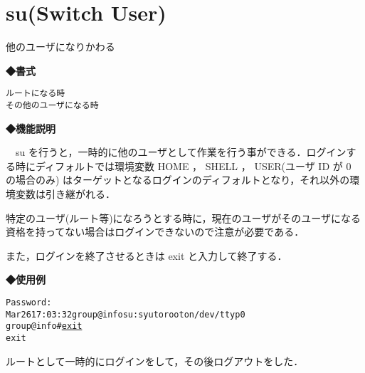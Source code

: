 \label{cmd:su}
\section{su(Switch User)}

他のユーザになりかわる\par

{\bf ◆書式}
\begin{center}
\begin{screen}
\begin{alltt}
 ルートになる時
 % su
 その他のユーザになる時
 % su ユーザ名
\end{alltt}
\end{screen}
\end{center}

{\bf ◆機能説明}

　su を行うと，一時的に他のユーザとして作業を行う事ができる．ログインする時にディフォルトでは環境変数 HOME ， SHELL ， USER(ユーザ ID が 0 の場合のみ) はターゲットとなるログインのディフォルトとなり，それ以外の環境変数は引き継がれる．\par
 特定のユーザ(ルート等)になろうとする時に，現在のユーザがそのユーザになる資格を持ってない場合はログインできないので注意が必要である．\par
 また，ログインを終了させるときは exit と入力して終了する．\par
{\bf ◆使用例}
\begin{center}
\begin{breakbox}
\begin{alltt}
 % \underline{su}  \keybox{Enter} 
 Password: 
 Mar 26 17:03:32 group@info su: syu to root on /dev/ttyp0
 group@info#  \underline{exit}  
 exit
 %
\end{alltt}
\end{breakbox}
\end{center}
ルートとして一時的にログインをして，その後ログアウトをした．

\clearpage

